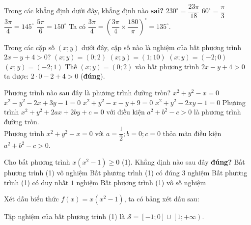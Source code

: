 \begin{ex}%
	Trong các khẳng định dưới đây, khẳng định nào \textbf{sai?}
	\choice
	{$230^\circ=\dfrac{23\pi}{18}$}
	{$60^\circ=\dfrac{\pi}{3}$}
	{\True $\dfrac{3\pi}{4}=145^\circ$}
	{$\dfrac{5\pi}{6}=150^\circ$}
	\loigiai
	{
		Ta có $\dfrac{3\pi}{4}=\left(\dfrac{3\pi}{4} \times \dfrac{180}{\pi}\right)^\circ=135^\circ$.
	}
\end{ex}

\begin{ex}%
	Trong các cặp số $(x;y)$ dưới đây, cặp số nào là nghiệm của bất phương trình\\ $2x-y+4>0$?
	\choice
	{\True $(x;y)=(0;2)$}
	{$(x;y)=(1;10)$}
	{$(x;y)=(-2;0)$}
	{$(x;y)=(-2;1)$}
	\loigiai
	{
		Thế $(x;y)=(0;2)$ vào bất phương trình $2x-y+4>0$ ta được: $2\cdot0-2+4>0$ (\textbf{đúng}).
	}
\end{ex}

\begin{ex}%
	Phương trình nào sau đây là phương trình đường tròn?
	\choice
	{\True $x^2+y^2-x=0$}
	{$x^2-y^2-2x+3y-1=0$}
	{$x^2+y^2-x-y+9=0$}
	{$x^2+y^2-2xy-1=0$}
	\loigiai
	{
		Phương trình $x^2+y^2+2ax+2by+c=0$ với điều kiện $a^2+b^2-c>0$ là phương trình đường tròn.\\
		Phương trình $x^2+y^2-x=0$ với $a=\dfrac{1}{2};b=0;c=0$ thỏa mãn điều kiện $a^2+b^2-c>0$.
	}
\end{ex}

\begin{ex}%
	Cho bất phương trình $x(x^2-1)\ge0$ (1). Khẳng định nào sau đây \textbf{đúng?}
	\choice
	{Bất phương trình (1) vô nghiệm} 
	{Bất phương trình (1) có đúng $3$ nghiệm}
	{Bất phương trình (1) có duy nhất $1$ nghiệm}
	{\True Bất phương trình (1) vô số nghiệm}
	\loigiai
	{
		Xét dấu biểu thức $f(x)=x(x^2-1)$, ta có bảng xét dấu sau:
		\begin{center}
		\end{center}
		Tập nghiệm của bất phương trình (1) là $\mathcal{S}=\left[-1;0\right] \cup \left[1;+\infty\right)$.
	}
\end{ex}

